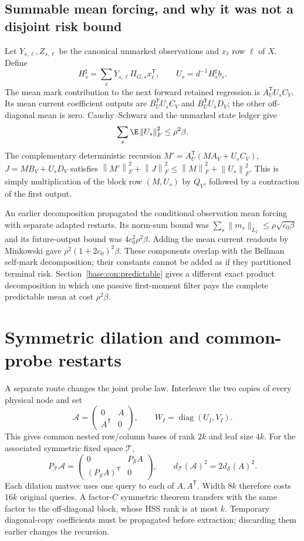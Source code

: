 \documentclass[11pt,oneside,openany,a4paper]{book}
\numberwithin{equation}{chapter}
\theoremstyle{definition}
\theoremstyle{remark}
\newcommand{\T}{\mathsf T}\newcommand{\Id}{I}
\newcommand{\F}[1]{\left\lVert#1\right\rVert_F}
\begin{document}
\subsection{Summable mean forcing, and why it was not a disjoint risk bound}
Let $Y_{s,\ell},Z_{s,\ell}$ be the canonical unmarked observations and $x_\ell$ row $\ell$ of $X$. Define
\[
 H_s^\sharp=\sum_\ell Y_{s,\ell}\Pi_{G,s}x_\ell^\T,
 \qquad U_s=d^{-1}H_s^\sharp b_s.
\]
The mean mark contribution to the next forward retained regression is
$A_U^\T U_sC_V$. Its mean current coefficient outputs are
$B_U^\T U_sC_V$ and $B_U^\T U_sD_V$; the other off-diagonal mean is zero. Cauchy--Schwarz and the unmarked state ledger give
\[
 \sum_s\E\F{U_s}^2\le\rho^2\beta.
\]
The complementary deterministic recursion
$M'=A_U^\T(MA_V+U_sC_V)$,
$J=MB_V+U_sD_V$ satisfies
$\F{M'}^2+\F J^2\le\F M^2+\F{U_s}^2$.
This is simply multiplication of the block row $(M,U_s)$ by $Q_V$, followed by a contraction of the first output.

An earlier decomposition propagated the conditional observation mean forcing with separate adapted restarts. Its norm-sum bound was
$\sum_s\|m_s\|_{L_2}\le\rho\sqrt{c_0\beta}$ and its future-output bound was $4c_0^2\rho^2\beta$. Adding the mean current readouts by Minkowski gave
$\rho^2(1+2c_0)^2\beta$. These components overlap with the Bellman self-mark decomposition; their constants cannot be added as if they partitioned terminal risk. Section~\ref{base:con:predictable} gives a different exact product decomposition in which one passive first-moment filter pays the complete predictable mean at cost $\rho^2\beta$.

\section{Symmetric dilation and common-probe restarts}\label{base:con:symmetric}
A separate route changes the joint probe law. Interleave the two copies of every physical node and set
\[
 \mathcal A=\begin{pmatrix}0&A\\A^\T&0\end{pmatrix},\qquad
 W_I=\operatorname{diag}(U_I,V_I).
\]
This gives common nested row/column bases of rank $2k$ and leaf size $4k$. For the associated symmetric fixed space $\mathcal T$,
\[
 P_{\mathcal T}\mathcal A=
 \begin{pmatrix}0&P_{\mathcal S}A\\(P_{\mathcal S}A)^\T&0\end{pmatrix},
 \qquad d_{\mathcal T}(\mathcal A)^2=2d_{\mathcal S}(A)^2.
\]
Each dilation matvec uses one query to each of $A,A^\T$. Width $8k$ therefore costs $16k$ original queries. A factor-$C$ symmetric theorem transfers with the same factor to the off-diagonal block, whose HSS rank is at most $k$. Temporary diagonal-copy coefficients must be propagated before extraction; discarding them earlier changes the recursion.
\end{document}
